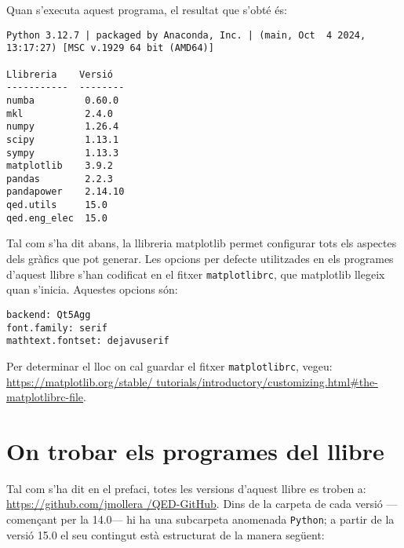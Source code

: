 Quan s'executa aquest programa, el resultat que s'obté és:
\lstset{
	language=,
	numbers=none,
	frame=none
}

\begin{lstlisting}
Python 3.12.7 | packaged by Anaconda, Inc. | (main, Oct  4 2024, 13:17:27) [MSC v.1929 64 bit (AMD64)] 

Llibreria    Versió
-----------  --------
numba         0.60.0
mkl           2.4.0
numpy         1.26.4
scipy         1.13.1
sympy         1.13.3
matplotlib    3.9.2
pandas        2.2.3
pandapower    2.14.10
qed.utils     15.0
qed.eng_elec  15.0
\end{lstlisting} 


Tal com s'ha dit abans, la llibreria matplotlib permet configurar tots els aspectes dels gràfics que pot generar. Les opcions per defecte utilitzades en els programes d'aquest llibre s'han codificat en el fitxer \texttt{matplotlibrc}, que matplotlib llegeix quan s'inicia. Aquestes opcions són:
\begin{lstlisting}
backend: Qt5Agg
font.family: serif
mathtext.fontset: dejavuserif
\end{lstlisting} 

Per determinar el lloc on cal guardar el fitxer \texttt{matplotlibrc}, vegeu: \href{https://matplotlib.org/stable/tutorials/introductory/customizing.html#the-matplotlibrc-file}{https:/\!\!/matplotlib.org/stable/ tutorials/introductory/customizing.html\#the-matplotlibrc-file}.



\section{On trobar els programes del llibre}\label{sec:progs-llibre-internet}

Tal com s'ha dit en el prefaci, totes les versions d'aquest llibre es troben a:
\href{https://github.com/jmollera/QED-GitHub}{https:/\!\!/github.com/jmollera
/QED-GitHub}.  Dins de la carpeta de cada versió ---començant per la 14.0--- hi ha una subcarpeta anomenada \texttt{Python}; a partir de la versió 15.0  el seu contingut està estructurat de la manera següent: 
 
